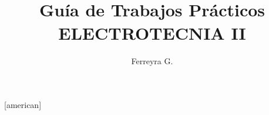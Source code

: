 \usepackage[utf8]{inputenc}
\usepackage[spanish]{babel}
\usepackage{circuitikz}[american]
\usepackage{iramA4,amsmath,pgfplots,newtxtext,newtxmath,steinmetz}
\usepackage{sectsty,longtable,enumitem,tikz,subfiles,rotating}
\usepackage[toc]{glossaries}
\usepackage{subfiles}
\usepackage[]{toolsgf}
\usepackage{titletoc}
\usepackage{sectsty}
\usepackage{fancyhdr,geometry}
\usepackage{pdfpages}
\usepackage{titlesec}
\usepackage{cancel}

    \sectionfont{\sffamily\Large}
    \subsectionfont{\sffamily}

\pgfplotsset{compat=1.7}

\newcommand{\materia}{ELECTROTECNIA II}
\newcommand{\TP}{}
\newcommand{\logo}{images/logos/4124}
\newcommand{\email}{gustavoferreyra@outlook.com}
\newcommand{\classroomcode}{.......}
\newcommand{\urlqr}{https://es.scribd.com/document/528527875/}
\title{ \logoo \\ \Huge Guía de Trabajos Prácticos\\  \textbf{\materia}}
\author{Ferreyra G.}
\date{}
\sectionfont{\sffamily}
\subsectionfont{\sffamily}


